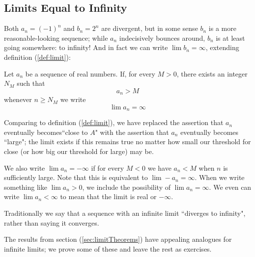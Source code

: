 

\subsection{Limits Equal to Infinity}
Both $a_n = (-1)^n$ and $b_n=2^n$ are divergent, but in some sense $b_n$ is a more reasonable-looking sequence; while $a_n$ indecisively bounces around, $b_n$ is at least going somewhere: to infinity! And in fact we can write $\lim b_n = \infty$, extending definition (\ref{def:limit}): 
\begin{defn}\label{def:limitEqInfty}
Let $a_n$ be a sequence of real numbers. If,
for every $M > 0$, there exists an integer $N_M$ such that
\[
a_n > M
\]
whenever $n \geq N_M$ we write
\[
\lim a_n = \infty
\]
\end{defn}
Comparing to definition (\ref{def:limit}), we have replaced the assertion that $a_n$ eventually becomes``close to $A$" with the assertion that $a_n$ eventually becomes ``large"; the limit exists if this remains true no matter how small our threshold for close (or how big our threshold for large) may be.

We also write $\lim a_n = -\infty$ if for every $M<0$ we have $a_n < M$ when $n$ is sufficiently large. Note that this is equivalent to $\lim -a_n = \infty$. When we write something like $\lim a_n > 0$, we include the possibility of  $\lim a_n = \infty$. We even can write $\lim a_n < \infty$ to mean that the limit is real or $-\infty$.

Traditionally we say that a sequence with an infinite limit ``diverges to infinity", rather than saying it converges.

The results from section (\ref{sec:limitTheorems}) have appealing analogues for infinite limits; we prove some of these and leave the rest as exercises.

